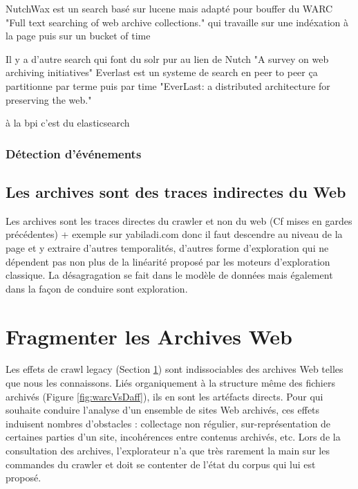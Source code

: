 \documentclass[symmetric,justified,marginals=raggedouter]{tufte-book}
\begin{document}
NutchWax est un search basé sur lucene mais adapté pour bouffer du WARC "Full text searching of web archive collections." qui travaille sur une indéxation à la page puis sur un bucket of time

Il y a d'autre search qui font du solr pur au lien de Nutch "A survey on web archiving initiatives"
Everlast est un systeme de search en peer to peer 
ça partitionne par terme puis par time "EverLast:  a distributed architecture for preserving the web."

à la bpi c'est du elasticsearch 


\subsection{Détection d'événements}

\section{Les archives sont des traces indirectes du Web}
\label{sec:4_legacy}

Les archives sont les traces directes du crawler et non du web (Cf mises en gardes précédentes) + exemple sur yabiladi.com donc il faut descendre au niveau de la page et y extraire d'autres temporalités, d'autres forme d'exploration qui ne dépendent pas non plus de la linéarité proposé par les moteurs d'exploration classique.
La désagragation se fait dans le modèle de données mais également dans la façon de conduire sont exploration. 


\chapter{Fragmenter les Archives Web}
\label{chap:5}

\par\noindent Les effets de crawl legacy (Section \ref{sec:4_legacy}) sont indissociables des archives Web telles que nous les connaissons. Liés organiquement à la structure même des fichiers archivés (Figure \ref{fig:warcVsDaff}), ils en sont les artéfacts directs. Pour qui souhaite conduire l'analyse d'un ensemble de sites Web archivés, ces effets induisent nombres d'obstacles : collectage non régulier, sur-représentation de certaines parties d'un site, incohérences entre contenus archivés, etc. Lors de la consultation des archives, l'explorateur n'a que très rarement la main sur les commandes du crawler et doit se contenter de l'état du corpus qui lui est proposé.
\end{document}
